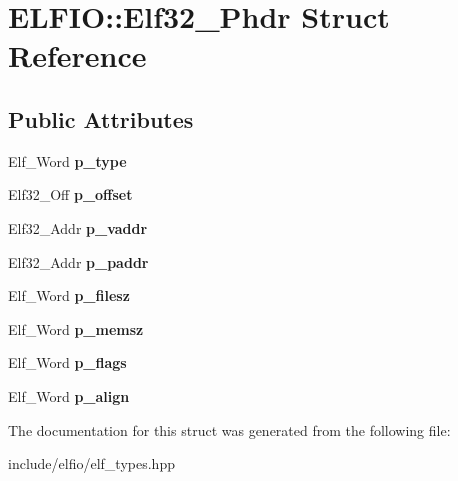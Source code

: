 \hypertarget{struct_e_l_f_i_o_1_1_elf32___phdr}{}\section{E\+L\+F\+IO\+:\+:Elf32\+\_\+\+Phdr Struct Reference}
\label{struct_e_l_f_i_o_1_1_elf32___phdr}
\subsection*{Public Attributes}
\begin{DoxyCompactItemize}
\item 
Elf\+\_\+\+Word {\bfseries p\+\_\+type}\hypertarget{struct_e_l_f_i_o_1_1_elf32___phdr_a9ac737ab0bf339c7f38747d31e850c12}{}\label{struct_e_l_f_i_o_1_1_elf32___phdr_a9ac737ab0bf339c7f38747d31e850c12}

\item 
Elf32\+\_\+\+Off {\bfseries p\+\_\+offset}\hypertarget{struct_e_l_f_i_o_1_1_elf32___phdr_aa84dba43b7f41d80c1890a35a16363bd}{}\label{struct_e_l_f_i_o_1_1_elf32___phdr_aa84dba43b7f41d80c1890a35a16363bd}

\item 
Elf32\+\_\+\+Addr {\bfseries p\+\_\+vaddr}\hypertarget{struct_e_l_f_i_o_1_1_elf32___phdr_addd5f0ee4042bb49688541b9da9e9198}{}\label{struct_e_l_f_i_o_1_1_elf32___phdr_addd5f0ee4042bb49688541b9da9e9198}

\item 
Elf32\+\_\+\+Addr {\bfseries p\+\_\+paddr}\hypertarget{struct_e_l_f_i_o_1_1_elf32___phdr_a3d06d7c065024786fc121830273a2668}{}\label{struct_e_l_f_i_o_1_1_elf32___phdr_a3d06d7c065024786fc121830273a2668}

\item 
Elf\+\_\+\+Word {\bfseries p\+\_\+filesz}\hypertarget{struct_e_l_f_i_o_1_1_elf32___phdr_abfd3c5263d57dca0d1a67ee0ccf98648}{}\label{struct_e_l_f_i_o_1_1_elf32___phdr_abfd3c5263d57dca0d1a67ee0ccf98648}

\item 
Elf\+\_\+\+Word {\bfseries p\+\_\+memsz}\hypertarget{struct_e_l_f_i_o_1_1_elf32___phdr_a9fb163cd27826373ea19bf3241767ba8}{}\label{struct_e_l_f_i_o_1_1_elf32___phdr_a9fb163cd27826373ea19bf3241767ba8}

\item 
Elf\+\_\+\+Word {\bfseries p\+\_\+flags}\hypertarget{struct_e_l_f_i_o_1_1_elf32___phdr_a320ffbc9afc46c13d6a12b58f05ca61c}{}\label{struct_e_l_f_i_o_1_1_elf32___phdr_a320ffbc9afc46c13d6a12b58f05ca61c}

\item 
Elf\+\_\+\+Word {\bfseries p\+\_\+align}\hypertarget{struct_e_l_f_i_o_1_1_elf32___phdr_ad14b20756ff2336b1b9f1d7721f5e898}{}\label{struct_e_l_f_i_o_1_1_elf32___phdr_ad14b20756ff2336b1b9f1d7721f5e898}

\end{DoxyCompactItemize}


The documentation for this struct was generated from the following file\+:\begin{DoxyCompactItemize}
\item 
include/elfio/elf\+\_\+types.\+hpp\end{DoxyCompactItemize}
